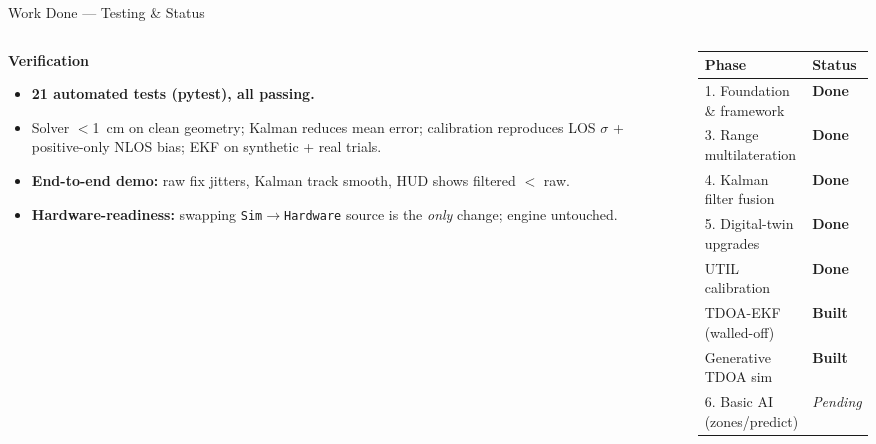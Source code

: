 \documentclass[aspectratio=169,10pt]{beamer}
\begin{document}
\begin{frame}{Work Done --- Testing \& Status}
  \begin{columns}[T]
    \begin{column}{0.5\textwidth}
      \textbf{Verification}
      \begin{itemize}\small
        \item \textbf{21 automated tests (pytest), all passing.}
        \item Solver $<$1~cm on clean geometry; Kalman reduces mean error; calibration reproduces LOS $\sigma$ +
              positive-only NLOS bias; EKF on synthetic + real trials.
        \item \textbf{End-to-end demo:} raw fix jitters, Kalman track smooth, HUD shows filtered $<$ raw.
        \item \textbf{Hardware-readiness:} swapping \texttt{Sim}$\rightarrow$\texttt{Hardware} source is the \emph{only}
              change; engine untouched.
      \end{itemize}
    \end{column}
    \begin{column}{0.5\textwidth}
      \small
      \begin{tabular}{ll}
        \toprule
        Phase & Status \\
        \midrule
        1. Foundation \& framework   & \textbf{Done} \\
        3. Range multilateration     & \textbf{Done} \\
        4. Kalman filter fusion      & \textbf{Done} \\
        5. Digital-twin upgrades     & \textbf{Done} \\
        UTIL calibration             & \textbf{Done} \\
        TDOA-EKF (walled-off)        & \textbf{Built} \\
        Generative TDOA sim          & \textbf{Built} \\
        6. Basic AI (zones/predict)  & \emph{Pending} \\
        \bottomrule
      \end{tabular}
    \end{column}
  \end{columns}
\end{frame}

\end{document}
